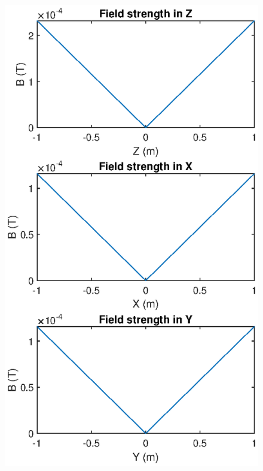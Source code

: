 \documentclass{book}
\theoremstyle{definition}
\begin{document}
\begin{figure}[!htb]
\begin{minipage}{.33\textwidth}
		\includegraphics[width=\linewidth]{sim-figs/quad-3.eps}
	\end{minipage}%
\end{figure}
\end{document}
